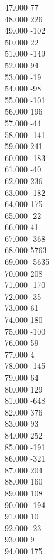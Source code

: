 { 47.000	77 \\
 48.000	226 \\
 49.000	-102 \\
 50.000	22 \\
 51.000	-149 \\
 52.000	94 \\
 53.000	-19 \\
 54.000	-98 \\
 55.000	-101 \\
 56.000	196 \\
 57.000	-44 \\
 58.000	-141 \\
 59.000	241 \\
 60.000	-183 \\
 61.000	-40 \\
 62.000	236 \\
 63.000	-182 \\
 64.000	175 \\
 65.000	-22 \\
 66.000	41 \\
 67.000	-368 \\
 68.000	5763 \\
 69.000	-5635 \\
 70.000	208 \\
 71.000	-170 \\
 72.000	-35 \\
 73.000	61 \\
 74.000	180 \\
 75.000	-100 \\
 76.000	59 \\
 77.000	4 \\
 78.000	-145 \\
 79.000	64 \\
 80.000	129 \\
 81.000	-648 \\
 82.000	376 \\
 83.000	93 \\
 84.000	252 \\
 85.000	-191 \\
 86.000	-321 \\
 87.000	204 \\
 88.000	160 \\
 89.000	108 \\
 90.000	-194 \\
 91.000	10 \\
 92.000	-23 \\
 93.000	9 \\
 94.000	175 \\
}
